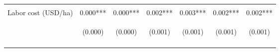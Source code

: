 \begin{center}
\begin{tabular}{lcccccc}
\vspace{4pt} & \begin{footnotesize}[0.002]\end{footnotesize} & \begin{footnotesize}[0.001]\end{footnotesize} & \begin{footnotesize}[0.038]\end{footnotesize} & \begin{footnotesize}[0.018]\end{footnotesize} & \begin{footnotesize}[0.047]\end{footnotesize} & \begin{footnotesize}[0.023]\end{footnotesize} \\
Labor cost (USD/ha) & 0.000*** & 0.000*** & 0.002*** & 0.003*** & 0.002*** & 0.002*** \\
 & \begin{footnotesize}(0.000)\end{footnotesize} & \begin{footnotesize}(0.000)\end{footnotesize} & \begin{footnotesize}(0.001)\end{footnotesize} & \begin{footnotesize}(0.001)\end{footnotesize} & \begin{footnotesize}(0.001)\end{footnotesize} & \begin{footnotesize}(0.001)\end{footnotesize} \\
\vspace{4pt} & \begin{footnotesize}[0.000]\end{footnotesize} & \begin{footnotesize}[0.000]\end{footnotesize} & \begin{footnotesize}[0.002]\end{footnotesize} & \begin{footnotesize}[0.001]\end{footnotesize} & \begin{footnotesize}[0.002]\end{footnotesize} & \begin{footnotesize}[0.001]\end{footnotesize} \\

\end{tabular}
\end{center}
